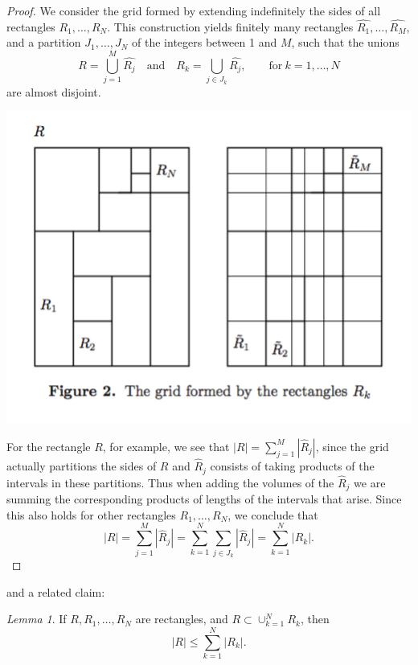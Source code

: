 \documentclass[a4paper, 11pt]{book}
\theoremstyle{definition}
\theoremstyle{remark}
\newtheorem{lemma}[theorem]{Lemma}
\begin{document}
    \begin{proof}
        We consider the grid formed by extending indefinitely the sides of all rectangles $R_1,\hdots,R_N$. This construction yields
        finitely many rectangles $\hat{R_1},\hdots,\hat{R_M}$, and a partition $J_1,\hdots,J_N$ of the integers between 1 and $M$,
        such that the unions
        \[ R = \bigcup_{j=1}^M \hat{R_j}\quad\text{and}\quad R_k=\bigcup_{j\in J_k}\hat{R_j},\qquad\text{for}\:k=1,\hdots,N \]
        are almost disjoint.
        \begin{center}
            \includegraphics[scale=0.5]{fig2}\\
        \end{center}
        For the rectangle $R$, for example, we see that $|R| = \sum_{j=1}^M |\hat{R}_j|$, since the grid actually partitions
        the sides of $R$ and $\hat{R}_j$ consists of taking products of the intervals in these partitions. Thus when adding the
        volumes of the $\hat{R}_j$ we are summing the corresponding products of lengths of the intervals that arise. Since this
        also holds for other rectangles $R_1,\hdots,R_N$, we conclude that
        \[ |R| = \sum_{j=1}^M |\hat{R}_j| = \sum_{k=1}^N \sum_{j\in J_k} |\hat{R}_j| = \sum_{k=1}^N |R_k|. \]
    \end{proof}

    and a related claim:

    \begin{lemma}
        If $R,R_1,\hdots,R_N$ are rectangles, and $R \subset \cup_{k=1}^N R_k$, then
        \[ |R| \leq \sum_{k=1}^N |R_k|. \]
    \end{lemma}
\end{document}
